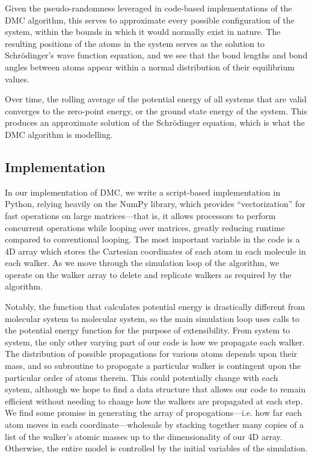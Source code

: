 \documentclass[journal=jacsat,manuscript=article]{achemso}
\begin{document}
Given the pseudo-randomness leveraged in code-based implementations of the DMC algorithm, this serves to approximate every possible configuration of the system, within the bounds in which it would normally exist in nature. The resulting positions of the atoms in the system serves as the solution to Schr\"odinger’s wave function equation, and we see that the bond lengths and bond angles between atoms appear within a normal distribution of their equilibrium values. 

Over time, the rolling average of the potential energy of all systems that are valid converges to the zero-point energy, or the ground state energy of the system. This produces an approximate solution of the Schr\"odinger equation, which is what the DMC algorithm is modelling.

\subsection{Implementation}
In our implementation of DMC, we write a script-based implementation in Python, relying heavily on the NumPy library, which provides ``vectorization'' for fast operations on large matrices---that is, it allows processors to perform concurrent operations while looping over matrices, greatly reducing runtime compared to conventional looping. The most important variable in the code is a 4D array which stores the Cartesian coordinates of each atom in each molecule in each walker. As we move through the simulation loop of the algorithm, we operate on the walker array to delete and replicate walkers as required by the algorithm.

Notably, the function that calculates potential energy is drastically different from molecular system to molecular system, so the main simulation loop uses calls to the potential energy function for the purpose of extensibility. From system to system, the only other varying part of our code is how we propagate each walker. The distribution of possible propagations for various atoms depends upon their mass, and so subroutine to propogate a particular walker is contingent upon the particular order of atoms therein. This could potentially change with each system, although we hope to find a data structure that allows our code to remain efficient without needing to change how the walkers are propagated at each step. We find some promise in generating the array of propogations---i.e. how far each atom moves in each coordinate---wholesale by stacking together many copies of a list of the walker's atomic masses up to the dimensionality of our 4D array. Otherwise, the entire model is controlled by the initial variables of the simulation.
\end{document}
